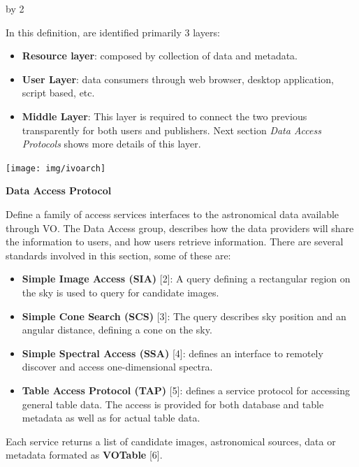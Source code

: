 \documentclass[11pt]{scrartcl}
\def\anzspalten{2}
\newlength{\kastenwidth}
\newenvironment{kasten}{
  \begin{lrbox}{\dummybox}
    \begin{minipage}{\linewidth}}
    {\end{minipage}
  \end{lrbox}
  \raisebox{-\depth}{\psshadowbox[cornersize=absolute,linearc=14pt,framesep=1em]{\usebox{\dummybox}}}\\[0.5em]}
\newenvironment{spalte}{
  \setlength\kastenwidth{1.2\textwidth}
  \divide\kastenwidth by \anzspalten
  \begin{minipage}[t]{\kastenwidth}}{\end{minipage}}
\begin{document}
\begin{lrbox}{\spalten}
{\begin{spalte}
\begin{kasten}
\begin{minipage}{0.5\linewidth}
			In this definition, are identified primarily 3 layers:
			\begin{itemize} \itemsep 0.5pt
			        \item \textbf{Resource layer}: composed by collection of data and metadata.
			        \item \textbf{User Layer}: data consumers through web browser, desktop application, script based, etc.
			        \item \textbf{Middle Layer}: This layer is required to connect the two previous
			transparently for both users and publishers. Next section \emph{Data Access Protocols} shows more details of this layer.
			\end{itemize}
			\end{minipage}
			\begin{minipage}{0.5\linewidth}
	                        \begin{center}
	                                \texttt{[image: img/ivoarch]}
	                        \end{center}
			\end{minipage}
			\textbf{Data Access Protocol}

			Define a family of access services interfaces to the astronomical data
			available through VO. The Data Access group, describes how the data providers
			will share the information to users, and how users retrieve information. There
			are several standards involved in this section, some of these are:
			\begin{itemize} \itemsep 0.5pt
			        \item \textbf{Simple Image Access (SIA)} [2]: A query defining a rectangular
			region on the sky is used to query for candidate images. 			
			        \item \textbf{Simple Cone Search (SCS)} [3]: The query describes sky position
			and an angular distance, defining a cone on the sky. 			
			        \item \textbf{Simple Spectral Access (SSA)} [4]: defines an interface to
			remotely discover and access one-dimensional spectra. 
			        \item \textbf{Table Access Protocol (TAP)} [5]: defines a service protocol for
			accessing general table data. The access is provided for both database and
			table metadata as well as for actual table data.
			\end{itemize}
			
			Each service returns a list of candidate images, astronomical sources, data or
			metadata formated as \textbf{VOTable} [6].


\end{kasten}
\end{spalte}}
\end{lrbox}
\end{document}
